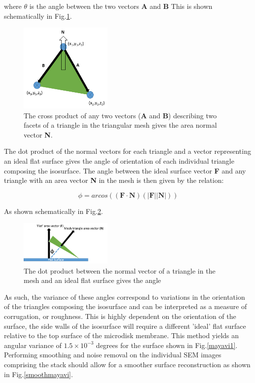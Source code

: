 where $\theta$ is the angle between the two vectors \textbf{A} and \textbf{B}
This is shown schematically in Fig.\ref{crossprod}.

\begin{figure}[h]
	\centering
	\includegraphics[width=0.4\textwidth]{Figs/Ch4/crossprod.png}
	\caption {The cross product of any two vectors (\textbf{A} and \textbf{B}) describing two facets of a triangle in the triangular mesh gives the area normal vector \textbf{N}.}
	\label{crossprod}
\end{figure}
\FloatBarrier

The dot product of the normal vectors for each triangle and a vector representing an ideal flat surface gives the angle of orientation of each individual triangle composing the isosurface. The angle between the ideal surface vector \textbf{F} and any triangle with an area vector \textbf{N} in the mesh is then given by the relation:

\begin{equation}
\phi = arcos((\textbf{F}\cdot\textbf{N})(|\textbf{F}||\textbf{N}|))
\end{equation}

As shown schematically in Fig.\ref{dotprod}. 

\begin{figure}[h]
	\centering
	\includegraphics[width=0.4\textwidth]{Figs/Ch4/roughnessangle.png}
	\caption {The dot product between the normal vector of a triangle in the mesh and an ideal flat surface gives the angle}
	\label{dotprod}
\end{figure}
\FloatBarrier


As such, the variance of these angles correspond to variations in the orientation of the triangles composing the isosurface and can be interpreted as a measure of corrugation, or roughness. This is highly dependent on the orientation of the surface, the side walls of the isosurface will require a different 'ideal' flat surface relative to the top surface of the microdisk membrane. This method yields an angular variance of $1.5 \times 10^{-3}$ degrees for the surface shown in Fig.\ref{mayavi1}.\\
Performing smoothing and noise removal on the individual SEM images comprising the stack should allow for a smoother surface reconstruction as shown in Fig.\ref{smoothmayavi}. 

